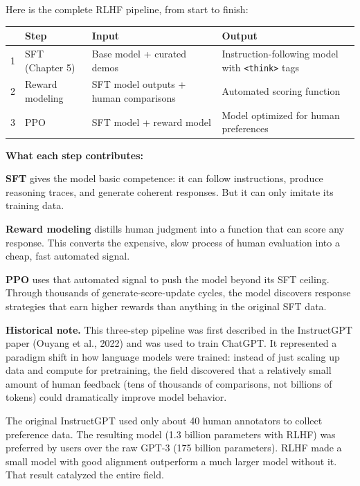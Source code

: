 \begin{chapterenv}
Here is the complete RLHF pipeline, from start to finish:

\begin{center}
\begin{tabular}{p{}p{}p{}p{}}
\toprule
& \textbf{Step} & \textbf{Input} & \textbf{Output} \\
\midrule
1 & SFT (Chapter 5) & Base model + curated demos & Instruction-following model with \texttt{<think>} tags \\
2 & Reward modeling & SFT model outputs + human comparisons & Automated scoring function \\
3 & PPO & SFT model + reward model & Model optimized for human preferences \\
\bottomrule
\end{tabular}
\end{center}

\textbf{What each step contributes:}

\textbf{SFT} gives the model basic competence: it can follow instructions, produce reasoning traces, and generate coherent responses. But it can only imitate its training data.

\textbf{Reward modeling} distills human judgment into a function that can score any response. This converts the expensive, slow process of human evaluation into a cheap, fast automated signal.

\textbf{PPO} uses that automated signal to push the model beyond its SFT ceiling. Through thousands of generate-score-update cycles, the model discovers response strategies that earn higher rewards than anything in the original SFT data.

\begin{infobox}
\textbf{Historical note.} This three-step pipeline was first described in the InstructGPT paper (Ouyang et al., 2022) and was used to train ChatGPT. It represented a paradigm shift in how language models were trained: instead of just scaling up data and compute for pretraining, the field discovered that a relatively small amount of human feedback (tens of thousands of comparisons, not billions of tokens) could dramatically improve model behavior.

The original InstructGPT used only about 40 human annotators to collect preference data. The resulting model (1.3 billion parameters with RLHF) was preferred by users over the raw GPT-3 (175 billion parameters). RLHF made a small model with good alignment outperform a much larger model without it. That result catalyzed the entire field.
\end{infobox}


\end{chapterenv}
